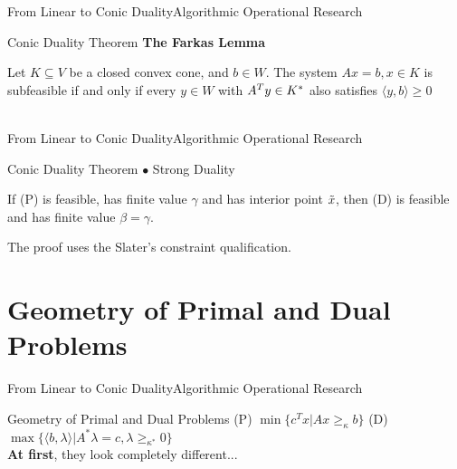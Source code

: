 \documentclass[11pt,aspectratio=169]{beamer}
\newcommand{\TT}{From Linear to Conic Duality}
\newcommand{\TL}{Algorithmic Operational Research}
\newcommand{\PI}{Conic Duality Theorem}
\newcommand{\PII}{Geometry of Primal and Dual Problems}
\begin{document}
\begin{frame}{\TT}{\TL}
 \begin{block}{\PI}
\Large 
\vspace{3mm}
\textbf{The Farkas Lemma} \\
\begin{Lemma} Let $K \subseteq V$ be a closed convex cone, and $b \in W$. The system $Ax = b, x \in K$ is subfeasible if and only if every $y \in W$ with $A^Ty \in K^{\**}$ also satisfies $\langle y, b \rangle \geq 0$ \newline \\
 \newline \\

\end{Lemma}

 \end{block}
\end{frame}


\begin{frame}{\TT}{\TL}
 \begin{block}{\PI}
\Large
$\bullet$ Strong Duality \newline \\
\begin{Theorem} If (P) is feasible, has finite value $\gamma$ and has interior point $\Tilde{x}$, then (D) is feasible and has finite value $\beta = \gamma$. \newline \\

\end{Theorem}
The proof uses the Slater's constraint qualification.
 \end{block}
\end{frame}

\section{\PII}
\begin{frame}{\TT}{\TL}
 \begin{block}{\PII}\pause 
 \Large
(P)\hspace{1mm} $\min\{c^Tx|Ax \geq_\kappa b \}$\newline
\newline
(D) $\max\{\langle b, \lambda \rangle | A^*\lambda = c, \lambda \geq_{\kappa^*} 0 \}$\newline \\
\textbf{At first}, they look completely different...
 \end{block}
\end{frame}
\end{document}
